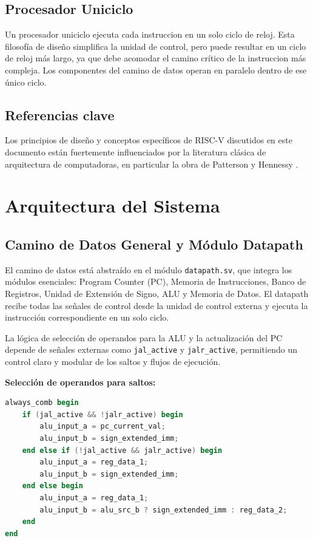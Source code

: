 \documentclass[conference]{IEEEtran}
\begin{document}
\subsection{Procesador Uniciclo}
Un procesador uniciclo ejecuta cada instruccion en un solo ciclo de reloj. Esta filosofía de diseño simplifica la unidad de control, pero puede resultar en un ciclo de reloj más largo, ya que debe acomodar el camino crítico de la instruccion más compleja. Los componentes del camino de datos operan en paralelo dentro de ese único ciclo.

\subsection{Referencias clave}
Los principios de diseño y conceptos específicos de RISC-V discutidos en este documento están fuertemente influenciados por la literatura clásica de arquitectura de computadoras, en particular la obra de Patterson y Hennessy \cite{PattersonHennessy2021RISCV}.

\section{Arquitectura del Sistema}
\label{sec:system_architecture}

\subsection{Camino de Datos General y Módulo Datapath}
El camino de datos está abstraído en el módulo \texttt{datapath.sv}, que integra los módulos esenciales: Program Counter (PC), Memoria de Instrucciones, Banco de Registros, Unidad de Extensión de Signo, ALU y Memoria de Datos. El datapath recibe todas las señales de control desde la unidad de control externa y ejecuta la instrucción correspondiente en un solo ciclo.

La lógica de selección de operandos para la ALU y la actualización del PC depende de señales externas como \texttt{jal\_active} y \texttt{jalr\_active}, permitiendo un control claro y modular de los saltos y flujos de ejecución.

\textbf{Selección de operandos para saltos:}
\begin{lstlisting}[language=Verilog, caption={Selección de operandos en datapath.sv}]
always_comb begin
    if (jal_active && !jalr_active) begin
        alu_input_a = pc_current_val;
        alu_input_b = sign_extended_imm;
    end else if (!jal_active && jalr_active) begin
        alu_input_a = reg_data_1;
        alu_input_b = sign_extended_imm;
    end else begin
        alu_input_a = reg_data_1;
        alu_input_b = alu_src_b ? sign_extended_imm : reg_data_2;
    end
end
\end{lstlisting}
\end{document}
